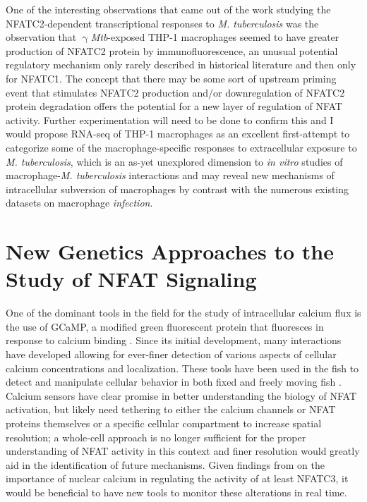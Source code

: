 One of the interesting observations that came out of the work studying the NFATC2\hyp{}dependent transcriptional responses to \textit{M. tuberculosis} was the observation that $\upgamma$\textit{Mtb}\hyp{}exposed THP\hyp{}1 macrophages seemed to have greater production of NFATC2 protein by immunofluorescence, an unusual potential regulatory mechanism only rarely described in historical literature \citep{Asagiri2005, Aramburu1995} and then only for NFATC1. The concept that there may be some sort of upstream priming event that stimulates NFATC2 production and/or downregulation of NFATC2 protein degradation offers the potential for a new layer of regulation of NFAT activity. Further experimentation will need to be done to confirm this and I would propose RNA\hyp{}seq of THP-1 macrophages as an excellent first\hyp{}attempt to categorize some of the macrophage\hyp{}specific responses to extracellular exposure to \textit{M. tuberculosis}, which is an as-yet unexplored dimension to \textit{in vitro} studies of macrophage-\textit{M. tuberculosis} interactions and may reveal new mechanisms of intracellular subversion of macrophages by contrast with the numerous existing datasets on macrophage \textit{infection}.

\section{New Genetics Approaches to the Study of NFAT Signaling}\label{nfatgenetics}

One of the dominant tools in the field for the study of intracellular calcium flux is the use of GCaMP, a modified green fluorescent protein that fluoresces in response to calcium binding \citep{Nakai2001}. Since its initial development, many interactions have developed allowing for ever\hyp{}finer detection of various aspects of cellular calcium concentrations and localization. These tools have been used in the fish to detect and manipulate cellular behavior in both fixed and freely moving fish \citep{Beerman2015, Kim2017}. Calcium sensors have clear promise in better understanding the biology of NFAT activation, but likely need tethering to either the calcium channels or NFAT proteins themselves or a specific cellular compartment to increase spatial resolution; a whole\hyp{}cell approach is no longer sufficient for the proper understanding of NFAT activity in this context and finer resolution would greatly aid in the identification of future mechanisms. Given findings from \citet{Kar2015} on the importance of nuclear calcium in regulating the activity of at least NFATC3, it would be beneficial to have new tools to monitor these alterations in real time. 

